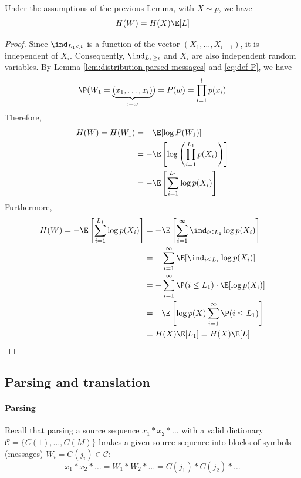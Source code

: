 \documentclass[toc, titlepaged]{../cs-classes/cs-classes}
\begin{document}
\begin{property}
    Under the assumptions of the previous Lemma, with $X\sim p$, we have
    \begin{equation}
        \label{eq:parsed-message-entropy}
        H(W) = H(X) \E[L]
    \end{equation}
\end{property}
\begin{proof}
    Since $\ind_{L_1<i}$ is a function of the vector $(X_1, \dots, X_{i-1})$, it is independent of $X_i$. Consequently, $\ind_{L_1\geq i}$ and $X_i$ are also independent random variables. By Lemma \ref{lem:distribution-parsed-messages} and \eqref{eq:def-P}, we have
    \begin{equation*}
        \P(W_1 = \underbrace{(x_1, \dots, x_l)}_{:=\omega}) = P(w) = \prod_{i=1}^l p(x_i)
    \end{equation*}
    Therefore,
    \begin{equation*}
        \begin{aligned}
            H(W) = H(W_1) &= - \E[\log P(W_1)]\\
            &= -\E\left[\log\left(\prod_{i=1}^{L_1}p(X_i)\right)\right]\\
            &= -\E\left[\sum_{i=1}^{L_1}\log p(X_i)\right]
        \end{aligned}
    \end{equation*}
    Furthermore,
    \begin{equation*}
        \begin{aligned}
            H(W) = -\E\left[\sum_{i=1}^{L_1}\log p(X_i)\right] &= -\E\left[\sum_{i=1}^\infty \ind_{i\leq L_1}\log p(X_i)\right]\\
            &= - \sum_{i=1}^\infty \E[\ind_{i\leq L_1} \log p(X_i)]\\
            &= - \sum_{i=1}^\infty \P(i\leq L_1) \cdot \E[\log p(X_i)]\\
            &= -\E\left[\log p(X) \sum_{i=1}^\infty \P(i\leq L_1)\right]\\
            &= H(X) \E[L_1] = H(X)\E[L]
        \end{aligned}
    \end{equation*}
\end{proof}

\subsection{Parsing and translation}
\paragraph*{Parsing} Recall that parsing a source sequence $x_1*x_2 * \dots$ with a valid dictionary $\mathcal{C} = \{C(1), \dots, C(M)\}$ brakes a given source sequence into blocks of symbols (messages) $W_i = C(j_i)\in\mathcal{C}$:
\begin{equation*}
    x_1*x_2*\dots = W_1 * W_2 * \dots = C(j_1) * C(j_2) * \dots
\end{equation*}
\end{document}
